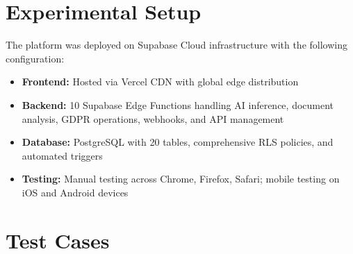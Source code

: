 \documentclass[12pt,a4paper,oneside]{report}
\begin{document}
\section{Experimental Setup}

The platform was deployed on Supabase Cloud infrastructure with the following configuration:
\begin{itemize}[leftmargin=2cm]
  \item \textbf{Frontend:} Hosted via Vercel CDN with global edge distribution
  \item \textbf{Backend:} 10 Supabase Edge Functions handling AI inference, document analysis, GDPR operations, webhooks, and API management
  \item \textbf{Database:} PostgreSQL with 20 tables, comprehensive RLS policies, and automated triggers
  \item \textbf{Testing:} Manual testing across Chrome, Firefox, Safari; mobile testing on iOS and Android devices
\end{itemize}

\section{Test Cases}
\end{document}
